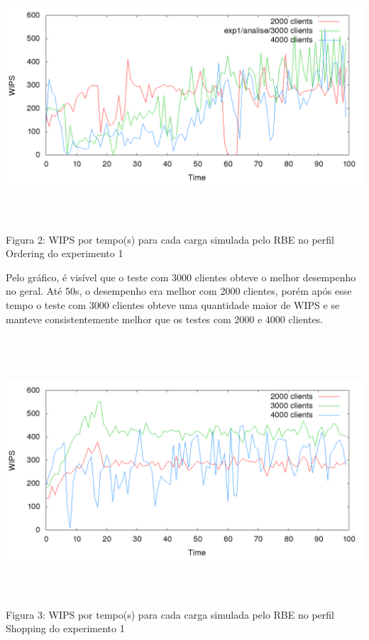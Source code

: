 \documentclass[11pt,twoside]{article}
\begin{document}
\begin{center}
\vspace{-1em}
\includegraphics[width=15cm, height=10cm]{images/exp1/plot_ordering}
Figura 2: WIPS por tempo(s) para cada carga simulada pelo RBE no perfil Ordering do experimento 1
\end{center}
Pelo gráfico, é visível que o teste com 3000 clientes obteve o melhor desempenho no geral. Até 50s, o desempenho era melhor com 2000 clientes, porém após esse tempo o teste com 3000 clientes obteve uma quantidade maior de WIPS e se manteve consistentemente melhor que os testes com 2000 e 4000 clientes.

\begin{center}
\includegraphics[width=15cm, height=10cm]{images/exp1/plot_shopping}
Figura 3: WIPS por tempo(s) para cada carga simulada pelo RBE no perfil Shopping do experimento 1
\end{center}
\end{document}
